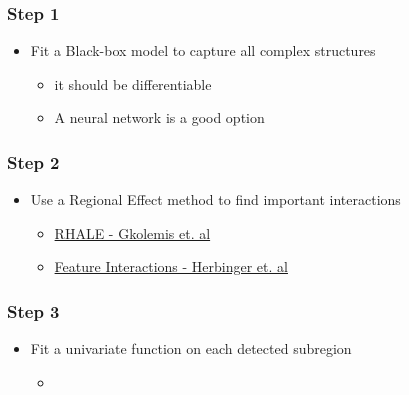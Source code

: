 \documentclass{beamer}
\begin{document}
\begin{frame}
  \frametitle{Step 1}
  \begin{itemize}
  \item Fit a Black-box model to capture all complex structures
    \begin{itemize}
    \item it should be differentiable
    \item A neural network is a good option
  \end{itemize}
\end{itemize}
\end{frame}

\begin{frame}
  \frametitle{Step 2}
  \begin{itemize}
  \item Use a Regional Effect method to find important interactions
    \begin{itemize}
    \item \href{https://givasile.github.io/assets/pdf/gkolemis23_rhale.pdf}{RHALE - Gkolemis et. al}
    \item \href{https://arxiv.org/pdf/2306.00541.pdf}{Feature Interactions - Herbinger et. al}
    \end{itemize}
  \end{itemize}
\end{frame}

\begin{frame}
  \frametitle{Step 3}
  \begin{itemize}
  \item Fit a univariate function on each detected subregion
    \begin{itemize}
    \item
    \end{itemize}
  \end{itemize}
\end{frame}
\end{document}
